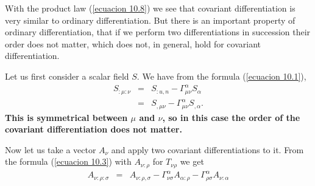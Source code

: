 With the product law (\ref{ecuacion 10.8}) we see that covariant 
differentiation is very similar to ordinary differentiation. But there is an 
important property of ordinary differentiation, that if we perform two 
differentiations in succession their order does not matter, which does not, in 
general, hold for covariant differentiation.

Let us first consider a scalar field $S$. We have from the formula 
(\ref{ecuacion 10.1}),
\begin{equation}
 \label{ecuacion 11.1}
 \begin{array}{rcl}
 S_{:\mu:\nu} & = & S_{:u,n} - \Gamma^{\alpha}_{\mu\nu} S_{\alpha} \\
      & = & S_{,\mu\nu} - \Gamma^{\alpha}_{\mu\nu} S_{,\alpha}.
 \end{array}
\end{equation}
\textbf{This is symmetrical between $\mu$ and $\nu$, so in this 
case the order of the covariant differentiation does not matter.}

Now let us take a vector $A_{\nu}$ and apply two covariant differentiations to 
it. From the formula (\ref{ecuacion 10.3}) with $A_{\nu:\rho}$ for 
$T_{\nu\rho}$ we get
\[
 \begin{array}{rcl}
  A_{\nu:\rho:\sigma} & = & A_{\nu:\rho,\sigma} 
  - \Gamma^{\alpha}_{\nu\sigma} A_{\alpha:\rho}
  - \Gamma^{\alpha}_{\rho\sigma} A_{\nu:\alpha} \\
 \end{array}
\]

